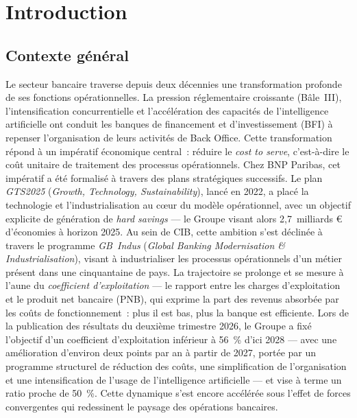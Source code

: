 \section*{Introduction}
\label{introduction}


\subsection*{Contexte général}

Le secteur bancaire traverse depuis deux décennies une transformation profonde de ses fonctions opérationnelles. La pression réglementaire croissante (Bâle~III), l'intensification concurrentielle et l'accélération des capacités de l'intelligence artificielle ont conduit les banques de financement et d'investissement (BFI) à repenser l'organisation de leurs activités de Back Office. Cette transformation répond à un impératif économique central~: réduire le \textit{cost to serve}, c'est-à-dire le coût unitaire de traitement des processus opérationnels. Chez BNP Paribas, cet impératif a été formalisé à travers des plans stratégiques successifs. Le plan \textit{GTS2025} (\textit{Growth, Technology, Sustainability}), lancé en 2022, a placé la technologie et l'industrialisation au cœur du modèle opérationnel, avec un objectif explicite de génération de \textit{hard savings} --- le Groupe visant alors 2,7~milliards € d'économies à horizon 2025. Au sein de CIB, cette ambition s'est déclinée à travers le programme \textit{GB~Indus} (\textit{Global Banking Modernisation \& Industrialisation}), visant à industrialiser les processus opérationnels d'un métier présent dans une cinquantaine de pays. La trajectoire se prolonge et se mesure à l'aune du \textit{coefficient d'exploitation} --- le rapport entre les charges d'exploitation et le produit net bancaire (PNB), qui exprime la part des revenus absorbée par les coûts de fonctionnement~: plus il est bas, plus la banque est efficiente. Lors de la publication des résultats du deuxième trimestre 2026, le Groupe a fixé l'objectif d'un coefficient d'exploitation inférieur à 56~\% d'ici 2028 --- avec une amélioration d'environ deux points par an à partir de 2027, portée par un programme structurel de réduction des coûts, une simplification de l'organisation et une intensification de l'usage de l'intelligence artificielle --- et vise à terme un ratio proche de 50~\%. Cette dynamique s'est encore accélérée sous l'effet de forces convergentes qui redessinent le paysage des opérations bancaires.

